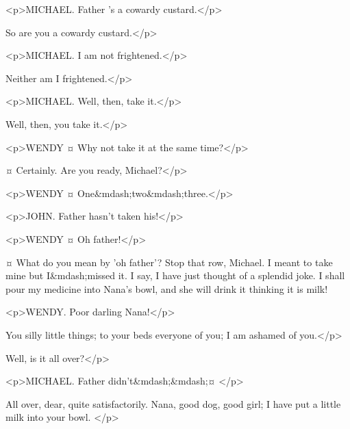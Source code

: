 <p>MICHAEL. Father 's a cowardy custard.</p>

\mrdarlingspeaks
So are you a cowardy custard.</p>


<p>MICHAEL. I am not frightened.</p>

\mrdarlingspeaks
Neither am I frightened.</p>

<p>MICHAEL. Well, then, take it.</p>

\mrdarlingspeaks
Well, then, you take it.</p>

<p>WENDY ¤
Why not take it at the same time?</p>

\mrdarlingspeaks {}¤
Certainly. Are you ready, Michael?</p>

<p>WENDY ¤
One&mdash;two&mdash;three.</p>


<p>JOHN. Father hasn't taken his!</p>


<p>WENDY ¤
Oh father!</p>

\mrdarlingspeaks {}¤
What do you mean by 'oh father'? Stop that row, Michael. I meant to take mine but I&mdash;missed it.
I say, I have just thought of a splendid joke.
I shall pour my medicine into Nana's bowl, and she will drink it thinking it is milk!

<p>WENDY. Poor darling Nana!</p>

\mrdarlingspeaks
You silly little things; to your beds everyone of you; I am ashamed of you.</p>


\mrsdarlingspeaks
Well, is it all over?</p>

<p>MICHAEL. Father didn't&mdash;&mdash;¤
</p>

\mrdarlingspeaks
All over, dear, quite satisfactorily.
Nana, good dog, good girl; I have put a little milk into your bowl.
</p>

